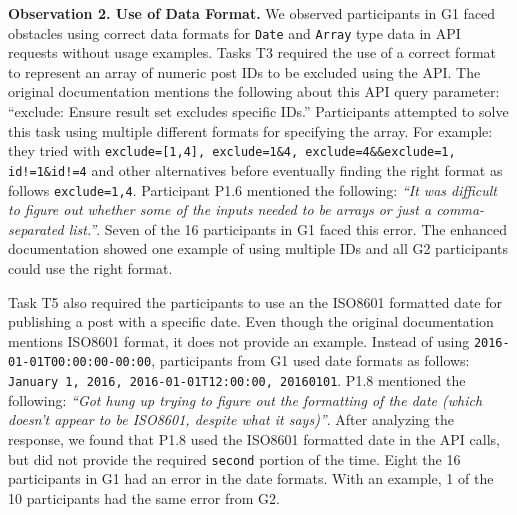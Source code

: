 \documentclass[conference]{IEEEtran}
\begin{document}
\hspace{-5mm}
\vspace{0.5mm}


\textbf{Observation 2. Use of Data Format.} We observed participants in G1 faced obstacles using correct data formats for \lstinline{Date} and \lstinline{Array} type data in API requests without usage examples. Tasks T3 required the use of a correct format to represent an array of numeric post IDs to be excluded using the API. The original documentation mentions the following about this API query parameter: ``exclude: Ensure result set excludes specific IDs.'' Participants attempted to solve this task using multiple different formats for specifying the array. For example: they tried with \lstinline{exclude=[1,4], exclude=1&4, exclude=4&&exclude=1, id!=1&id!=4} and other alternatives before eventually finding the right format as follows \lstinline{exclude=1,4}. Participant P1.6 mentioned the following: \textit{``It was difficult to figure out whether some of the inputs needed to be arrays or just a comma-separated list.''}. Seven of the 16 participants in G1 faced this error. The enhanced documentation showed one example of using multiple IDs and all G2 participants could use the right format.

Task T5 also required the participants to use an the ISO8601 formatted date for publishing a post with a specific date. Even though the original documentation mentions ISO8601 format, it does not provide an example. Instead of using \lstinline{2016-01-01T00:00:00-00:00}, participants from G1 used date formats as follows: \lstinline{January 1, 2016, 2016-01-01T12:00:00, 20160101}. P1.8 mentioned the following: \textit{``Got hung up trying to figure out the formatting of the date (which doesn't appear to be ISO8601, despite what it says)''}. After analyzing the response, we found that P1.8 used the ISO8601 formatted date in the API calls, but did not provide the required \lstinline{second} portion of the time. Eight the 16 participants in G1 had an error in the date formats. With an example, 1 of the 10 participants had the same error from G2.
\end{document}
